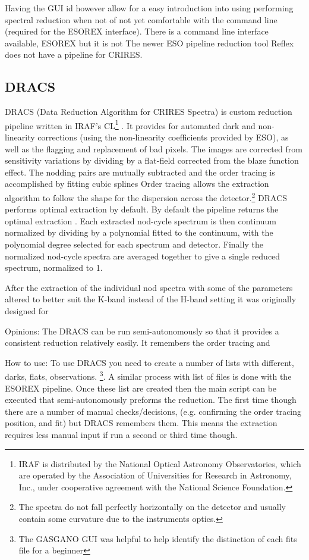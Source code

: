 Having the GUI id however allow for a easy introduction into using performing spectral reduction when not of not yet comfortable with the command line (required for the ESOREX interface).
There is a command line interface available, ESOREX but it is not The newer ESO pipeline reduction tool Reflex does not have a pipeline for CRIRES. 


\subsection{DRACS}
DRACS (Data Reduction Algorithm for CRIRES Spectra) is custom reduction pipeline \citep{figueira_radial_2010} written in IRAF's CL\footnote{IRAF is distributed by the National Optical Astronomy Observatories, which are operated by the Association of Universities for Research in Astronomy, {Inc.}, under cooperative agreement with the National Science Foundation.} \citep{tody_iraf_1993}.  It provides for automated dark and non-linearity corrections (using the non-linearity coefficients provided by ESO), as well as the flagging and replacement of bad pixels. The images are corrected from sensitivity variations by dividing by a flat-field corrected from the blaze function effect. The nodding pairs are mutually subtracted and the order tracing is accomplished by fitting cubic splines
Order tracing allows the extraction algorithm to follow the shape for the dispersion across the detector.\footnote{The spectra do not fall perfectly horizontally on the detector and usually contain some curvature due to the instruments optics.}     
DRACS performs optimal extraction\citep{horne_optimal_1986} by default. 
By default the pipeline returns the optimal extraction \citep{horne_optimal_1986}.
Each extracted nod-cycle spectrum is then continuum normalized by dividing by a polynomial fitted to the continuum, with the polynomial degree selected for each spectrum and detector. Finally the normalized nod-cycle spectra are averaged together to give a single reduced spectrum, normalized to 1.

After the extraction of the individual nod spectra 
with some of the parameters altered to better suit the K-band instead of the H-band setting it was originally designed for

Opinions:
The DRACS can be run semi-autonomously so that it provides a consistent reduction relatively easily. It remembers the order tracing and 

How to use:
To use DRACS you need to create a number of lists with different, darks, flats, observations. \footnote{The GASGANO GUI was helpful to help identify the distinction of each fits file for a beginner}. A similar process with list of files is done with the ESOREX pipeline.
Once these list are created then the main script can be executed that semi-autonomously preforms the reduction. The first time though there are a number of manual checks/decisions, (e.g. confirming the order tracing position, and fit) but DRACS remembers them. This means the extraction requires less manual input if run a second or third time though.

